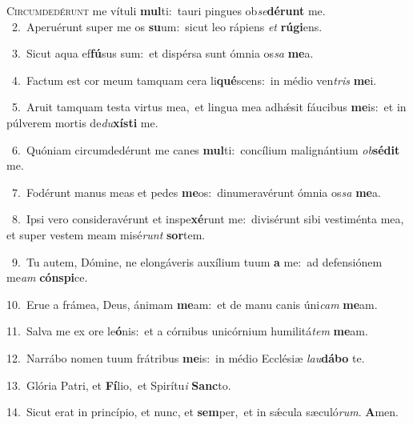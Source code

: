 \lettrine{\initial\textcolor{\initialcolor}{C}}{ircumdedérunt} me vítuli \textbf{mul}\-ti:~\star tauri pingues ob\-\textit{se}\-\textbf{dé}\textbf{runt} me.\\
{\numbfont\textcolor{\numbcolor}{~2.}}~Aperuérunt super me os \textbf{su}\-um:~\star sicut leo rápiens \textit{et} \textbf{rú}\-\textbf{gi}ens.\par
{\numbfont\textcolor{\numbcolor}{~3.}}~Sicut aqua ef\-\textbf{fú}\-sus sum:~\star et dispérsa sunt ómnia os\textit{sa} \textbf{me}\-a.\par
{\numbfont\textcolor{\numbcolor}{~4.}}~Factum est cor meum tamquam cera li\-\textbf{qué}\-scens:~\star in médio ven\textit{tris} \textbf{me}\-i.\par
{\numbfont\textcolor{\numbcolor}{~5.}}~Aruit tamquam testa virtus mea,~\dagger et lingua mea adhǽsit fáucibus \textbf{me}\-is:~\star et in púlverem mortis de\-\textit{du}\-\textbf{xís}\textbf{ti} me.\par
{\numbfont\textcolor{\numbcolor}{~6.}}~Quóniam circumdedérunt me canes \textbf{mul}\-ti:~\star concílium malignántium \textit{ob}\-\textbf{sé}\textbf{dit} me.\par
{\numbfont\textcolor{\numbcolor}{~7.}}~Fodérunt manus meas et pedes \textbf{me}\-os:~\star dinumeravérunt ómnia os\textit{sa} \textbf{me}\-a.\par
{\numbfont\textcolor{\numbcolor}{~8.}}~Ipsi vero consideravérunt et inspe\-\textbf{xé}\-runt me:~\star divisérunt sibi vestiménta mea, et super vestem meam misé\textit{runt} \textbf{sor}\-tem.\par
{\numbfont\textcolor{\numbcolor}{~9.}}~Tu autem, Dómine, ne elongáveris auxílium tuum \textbf{a} me:~\star ad defensiónem me\textit{am} \textbf{cón}\-\textbf{spi}ce.\par
{\numbfont\textcolor{\numbcolor}{10.}}~Erue a frámea, Deus, ánimam \textbf{me}\-am:~\star et de manu canis úni\textit{cam} \textbf{me}\-am.\par
{\numbfont\textcolor{\numbcolor}{11.}}~Salva me ex ore le\-\textbf{ó}\-nis:~\star et a córnibus unicórnium humilitá\textit{tem} \textbf{me}\-am.\par
{\numbfont\textcolor{\numbcolor}{12.}}~Narrábo nomen tuum frátribus \textbf{me}\-is:~\star in médio Ecclésiæ \textit{lau}\-\textbf{dá}\textbf{bo} te.\par
{\numbfont\textcolor{\numbcolor}{13.}}~Glória Patri, et \textbf{Fí}\-lio,~\star et Spirítu\textit{i} \textbf{Sanc}\-to.\par
{\numbfont\textcolor{\numbcolor}{14.}}~Sicut erat in princípio, et nunc, et \textbf{sem}\-per,~\star et in sǽcula sæculó\-\textit{rum}\-. \textbf{A}\-men.\par
